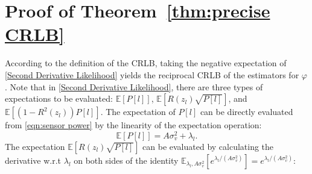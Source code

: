 \documentclass[journal,twocolumn]{IEEEtran}
\theoremstyle{nonumberplain}
\begin{document}
\section{Proof of \textbf{Theorem~\ref{thm:precise CRLB}}}\label{appendix:proof of theorem1}
    According to the definition of the CRLB, taking the negative expectation of \eqref{Second Derivative Likelihood} yields the reciprocal CRLB of the estimators for $\varphi$. Note that in \eqref{Second Derivative Likelihood}, there are three types of expectations to be evaluated: $\mathbb{E}\left[P[l]\right]$, $\mathbb{E}\left[R(z_l)\sqrt{P[l]}\right]$, and $\mathbb{E}\left[(1-R^2(z_l))P[l]\right]$. The expectation of $P[l]$ can be directly evaluated from \eqref{eqn:sensor power} by the linearity of the expectation operation:
    \begin{equation}
        \mathbb{E}\left[P[l]\right] = A\sigma_v^2 + \lambda_l.
        \label{eqn:expectation of P_l}
    \end{equation}
    The expectation $\mathbb{E}\left[R(z_l) \sqrt{P[l]}\right]$ can be evaluated by calculating the derivative w.r.t $\lambda_l$ on both sides of the identity $\mathbb{E}_{\lambda_l, A\sigma_v^2}[e^{\lambda_l/(A\sigma_v^2)}]=e^{\lambda_l/(A\sigma_v^2)}$:
\end{document}

